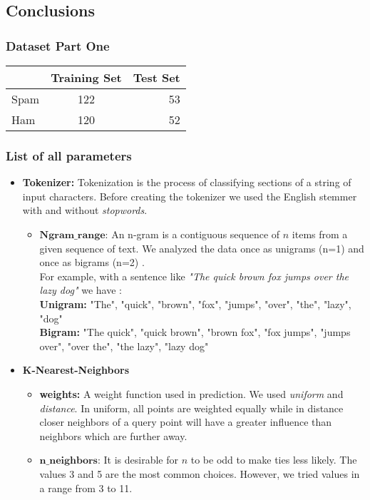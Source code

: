 \documentclass[11pt]{article}
\begin{document}
\subsection{Conclusions}
\subsubsection{Dataset Part One}
	\begin{tabular}{|l|c|r|}
	\hline
 		& Training Set & Test Set\\
	\hline
		Spam & 122 & 53\\
	\hline
		Ham & 120 & 52\\
	\hline
	\end{tabular}
	
\subsubsection{List of all parameters}
\begin{itemize}

		\item{\textbf{Tokenizer:}} Tokenization is the process of classifying sections of a string of input characters. Before creating the tokenizer we used the 		English stemmer with and without \textit{stopwords}. 
		\begin{itemize}
	\item{$\textbf{Ngram\_range:}$}  An n-gram is a contiguous sequence of $n$ items from a given sequence of text. We analyzed the data once as unigrams 		(n=1) and once as bigrams (n=2) .\\
		For example, with a sentence like \textit{"The quick brown fox jumps over the lazy dog"} we have :\\
		\textbf{Unigram:} "The", "quick", "brown", "fox", "jumps", "over", "the", "lazy", "dog"\\
		\textbf{Bigram:} "The quick", "quick brown", "brown fox", "fox jumps", "jumps over", "over the", "the lazy", "lazy dog"
	
	\end{itemize}


\item{\textbf{K-Nearest-Neighbors}} 

	\begin{itemize}

		\item{\textbf{weights:}} A weight function used in prediction. We used \textit{uniform} and \textit{distance}. In 			uniform, all points are 				weighted equally while in distance closer neighbors of a query point will have a 		greater influence than neighbors which are further 				away.

		\item{$\textbf{n\_neighbors:}$}  It is desirable for $n$ to be odd to make ties less likely. The values 		3 and 5 are the most common choices. 				However, we tried values in a range from 3 to 11.	
	\end{itemize}

\end{itemize}
\end{document}
